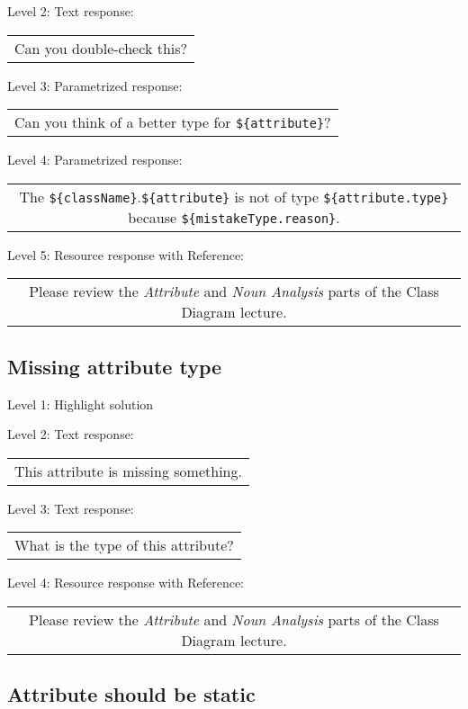 \noindent Level 2: Text response: \medskip

\begin{tabular}{|c}
Can you double-check this?
\end{tabular} \medskip

\noindent Level 3: Parametrized response: \medskip

\begin{tabular}{|c}
Can you think of a better type for \verb|${attribute}|?
\end{tabular} \medskip

\noindent Level 4: Parametrized response: \medskip

\begin{tabular}{|c}
The \verb|${className}|.\verb|${attribute}| is not of type \verb|${attribute.type}| because \verb|${mistakeType.reason}|.
\end{tabular} \medskip

\noindent Level 5: Resource response with Reference:

\begin{tabular}{|c}
Please review the \textit{Attribute} and \textit{Noun Analysis} parts of the Class Diagram lecture.
\end{tabular} \medskip


\subsection{Missing attribute type}

\noindent Level 1: Highlight solution \medskip

\noindent Level 2: Text response: \medskip

\begin{tabular}{|c}
This attribute is missing something.
\end{tabular} \medskip

\noindent Level 3: Text response: \medskip

\begin{tabular}{|c}
What is the type of this attribute?
\end{tabular} \medskip

\noindent Level 4: Resource response with Reference:

\begin{tabular}{|c}
Please review the \textit{Attribute} and \textit{Noun Analysis} parts of the Class Diagram lecture.
\end{tabular} \medskip


\subsection{Attribute should be static}

